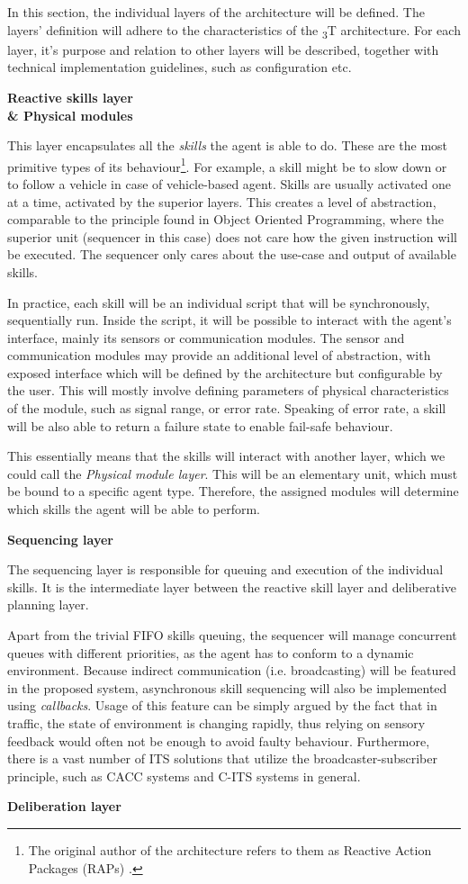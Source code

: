 \documentclass[main.tex]{subfiles}
\begin{document}
In this section, the individual layers of the architecture will be defined. The layers' definition will 
adhere to the characteristics of the \textsubscript{3}T architecture. For each layer, it's purpose and 
relation to other layers will be described, together with technical implementation guidelines, such as 
configuration etc.

\textbf{Reactive skills layer \\\& Physical modules}

This layer encapsulates all the \emph{skills} the agent is able to do. These are the 
most primitive types of its behaviour\footnote{The original author of the architecture refers to them 
as Reactive Action Packages (RAPs) \cite{Firby1987}.}. For example, a skill might be to slow
down or to follow a vehicle in case of vehicle-based agent. Skills are usually activated one at a time, 
activated by the superior layers. This creates a level of abstraction, comparable to the principle found 
in Object Oriented Programming, where the superior unit (sequencer in this case) does not care how the 
given instruction will be executed. The sequencer only cares about the use-case and output of available
skills. 

In practice, each skill will be an individual script that will be synchronously, sequentially run. Inside 
the script, it will be possible to interact with the agent's interface, mainly its sensors or communication 
modules. The sensor and communication modules may provide an additional level of abstraction,
with exposed interface which will be defined by the architecture but configurable by the user.
This will mostly involve defining parameters of physical characteristics of the module, such 
as signal range, or error rate. Speaking of error rate, a skill will be also able to return a 
failure state to enable fail-safe behaviour. 

This essentially means that the skills will interact with another layer, which we could call the
\emph{Physical module layer}. This will be an elementary unit, which must be bound to a specific agent type. 
Therefore, the assigned modules will determine which skills the agent will be able to perform.  

\textbf{Sequencing layer}

The sequencing layer is responsible for queuing and execution of the individual skills. It is the 
intermediate layer between the reactive skill layer and deliberative planning layer. 

Apart from the trivial FIFO skills queuing, the sequencer will manage concurrent queues with different 
priorities, as the agent has to conform to a dynamic environment. Because indirect communication (i.e. 
broadcasting) will be featured in the proposed system, asynchronous skill sequencing will also be 
implemented using \emph{callbacks}. Usage of this feature can be simply argued by the fact that in traffic, 
the state of environment is changing rapidly, thus relying on sensory feedback would often not be enough 
to avoid faulty behaviour. Furthermore, there is a vast number of ITS solutions that utilize the 
broadcaster-subscriber principle, such as CACC systems and C-ITS systems in general.

\textbf{Deliberation layer}



\clearpage
\end{document}
